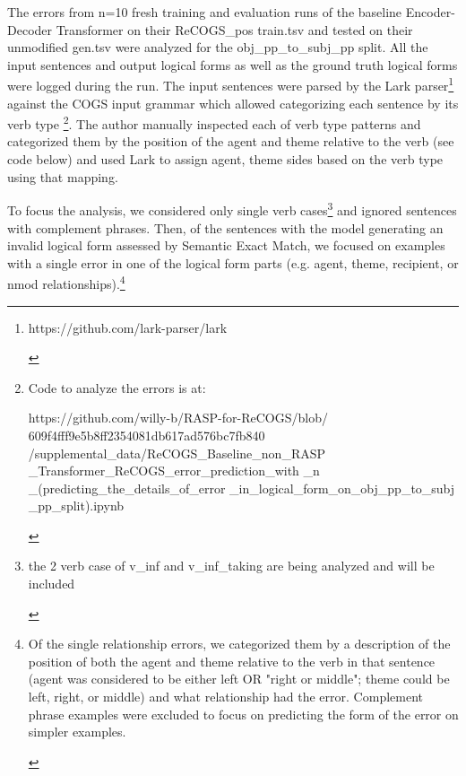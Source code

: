 \documentclass[11pt]{article}
\begin{document}
The errors from n=10 fresh training and evaluation runs of the baseline \cite{Wu2023} Encoder-Decoder Transformer on their ReCOGS\_pos train.tsv and tested on their unmodified gen.tsv were analyzed for the obj\_pp\_to\_subj\_pp split. All the input sentences and output logical forms as well as the ground truth logical forms were logged during the run. The input sentences were parsed by the Lark parser\footnote{\begin{footnotesize}https://github.com/lark-parser/lark\end{footnotesize}} against the COGS input grammar which allowed categorizing each sentence by its verb type \footnote{\begin{footnotesize}Code to analyze the errors is at: 

https://github.com/willy-b/RASP-for-ReCOGS/blob/
609f4fff9e5b8ff2354081db617ad576bc7fb840
/supplemental\_data/ReCOGS\_Baseline\_non\_RASP
\_Transformer\_ReCOGS\_error\_prediction\_with
\_n%
\_(predicting\_the\_details\_of\_error
\_in\_logical\_form\_on\_obj\_pp\_to\_subj
\_pp\_split).ipynb

\end{footnotesize}}. The author manually inspected each of verb type patterns and categorized them by the position of the agent and theme relative to the verb (see code below) and used Lark to assign agent, theme sides based on the verb type using that mapping.

To focus the analysis, we considered only single verb cases\footnote{\begin{footnotesize}the 2 verb case of v\_inf and v\_inf\_taking are being analyzed and will be included\end{footnotesize}} and ignored sentences with complement phrases. Then, of the sentences with the model generating an invalid logical form assessed by Semantic Exact Match, we focused on examples with a single error in one of the logical form parts (e.g. agent, theme, recipient, or nmod relationships).\footnote{\begin{footnotesize}Of the single relationship errors, we categorized them by a description of the position of both the agent and theme relative to the verb in that sentence (agent was considered to be either left OR "right or middle"; theme could be left, right, or middle) and what relationship had the error. Complement phrase examples were excluded to focus on predicting the form of the error on simpler examples.\end{footnotesize}}
\end{document}
